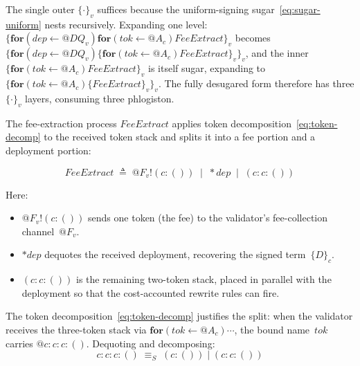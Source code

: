 \documentclass[11pt,a4paper]{article}
\makeatletter
\newcommand{\Par}{\mathbin{|}}
\newcommand{\forc}{\mathbf{for}}
\newcommand{\send}[2]{#1 !\!\left( #2 \right)}
\newcommand{\recv}[3]{\forc\!\left( #1 \leftarrow #2 \right) #3}
\newcommand{\drop}[1]{{\ast} #1}
\newcommand{\quot}[1]{@#1}
\newcommand{\signed}[2]{\{#1\}_{#2}}
\newcommand{\Seq}{\equiv_{\!S}}
\makeatother
\begin{document}
\noindent
The single outer $\signed{\cdot}{v}$ suffices because the
uniform-signing sugar~\eqref{eq:sugar-uniform} nests
recursively.  Expanding one level:
$\signed{\recv{\mathit{dep}}{\quot{DQ_v}}{\recv{\mathit{tok}}
{\quot{A_c}}{\mathit{FeeExtract}}}}{v}$ becomes
$\signed{\recv{\mathit{dep}}{\quot{DQ_v}}{\signed{\recv{\mathit{tok}}
{\quot{A_c}}{\mathit{FeeExtract}}}{v}}}{v}$, and the inner
$\signed{\recv{\mathit{tok}}{\quot{A_c}}
{\mathit{FeeExtract}}}{v}$ is itself sugar, expanding to
$\signed{\recv{\mathit{tok}}{\quot{A_c}}
{\signed{\mathit{FeeExtract}}{v}}}{v}$.  The fully desugared
form therefore has three $\signed{\cdot}{v}$ layers,
consuming three phlogiston.

The fee-extraction process $\mathit{FeeExtract}$ applies
token decomposition~\eqref{eq:token-decomp} to the received
token stack and splits it into a fee portion and a deployment
portion:

\begin{equation}
  \mathit{FeeExtract}
  \;\triangleq\;
  \send{\quot{F_v}}{c : ()}
  \;\Par\;
  \drop{\mathit{dep}} \;\Par\; (c : c : ())
  \label{eq:fee-extract}
\end{equation}

\noindent
Here:
\begin{itemize}[nosep]
  \item $\send{\quot{F_v}}{c : ()}$ sends one token (the fee)
    to the validator's fee-collection channel~$\quot{F_v}$.
  \item $\drop{\mathit{dep}}$ dequotes the received deployment,
    recovering the signed term~$\signed{D}{c}$.
  \item $(c : c : ())$ is the remaining two-token stack,
    placed in parallel with the deployment so that the
    cost-accounted rewrite rules can fire.
\end{itemize}

\noindent
The token decomposition~\eqref{eq:token-decomp} justifies the
split: when the validator receives the three-token stack via
$\recv{\mathit{tok}}{\quot{A_c}}{\cdots}$, the bound
name~$\mathit{tok}$ carries $\quot{c : c : c : ()}$.
Dequoting and decomposing:
\[
  c : c : c : ()
  \;\Seq\;
  (c : ()) \Par (c : c : ())
\]
\end{document}
